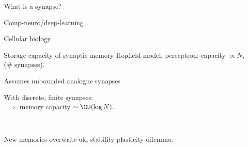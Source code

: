 \documentclass[final]{beamer}%
\begin{document}
\begin{frame}{What is a synapse?}
%
 \begin{center}
\begin{overlayarea}{0.95\linewidth}{0.1\textheight}
 {\parbox[c]{0.45\linewidth}{
   \begin{center}
     Comp-neuro/deep-learning
   \end{center}
 }}
 {\parbox[c]{0.45\linewidth}{
   \begin{center}
     Cellular biology
   \end{center}
 }}
\end{overlayarea}

\begin{overlayarea}{0.95\linewidth}{0.7\textheight}
%
 {\parbox[c]{0.45\linewidth}{
 }}
 {\parbox[c]{0.45\linewidth}{
 }}
\end{overlayarea}
 \end{center}
%
\end{frame}


\begin{frame}{Storage capacity of synaptic memory}
%
  Hopfield model, perceptron: capacity \alert{$\propto N$}, (\# synapses).

\vp\parbox[t]{0.59\linewidth}{%
  Assumes unbounded analogue synapses

 \vp With discrete, finite synapses:\\
 $\implies$ memory capacity  \alert{$\sim\CO(\log N)$}.
 \\ 
 }
 \parbox[t]{0.4\linewidth}{
    \hfill{}
 }
 \\


 \vp New memories overwrite old
 \impl stability-plasticity dilemma.
%
\end{frame}
\end{document}
